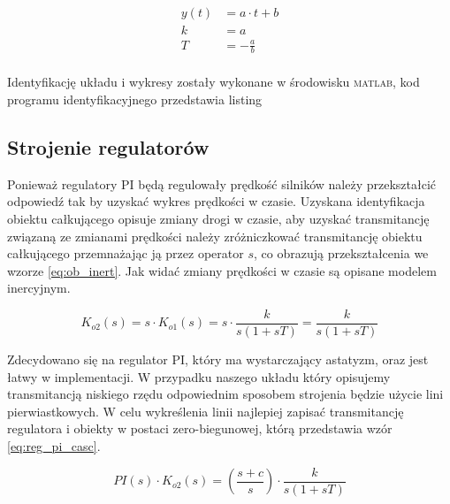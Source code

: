 \documentclass[11pt]{article}
\begin{document}
\begin{equation} \label{eq:line_param}
\begin{aligned}
	y(t) &= a \cdot t + b \\
	k &= a \\
	T &= - \frac{a}{b} \\
\end{aligned}
\end{equation}

Identyfikację układu i wykresy zostały wykonane w środowisku \textsc{matlab}, kod programu identyfikacyjnego przedstawia listing %

\subsection{Strojenie regulatorów}
Ponieważ regulatory \textsc{PI} będą regulowały prędkość silników należy przekształcić odpowiedź tak by uzyskać wykres prędkości w czasie.
Uzyskana identyfikacja obiektu całkującego opisuje zmiany drogi w czasie, aby uzyskać transmitancję związaną ze zmianami prędkości należy zróżniczkować transmitancję obiektu całkującego przemnażając ją przez operator $ s $, co obrazują przekształcenia we wzorze \ref{eq:ob_inert}. Jak widać zmiany prędkości w czasie są opisane modelem inercyjnym.

\begin{equation} \label{eq:ob_inert}
	K_{o2} \left( s \right) = s \cdot K_{o1} \left( s \right) = s \cdot \frac{k}{s \left( 1 + sT \right)} = \frac{k}{s \left( 1 + sT \right)}
\end{equation}

Zdecydowano się na regulator \textsc{PI}, który ma wystarczający astatyzm, oraz jest łatwy w implementacji.
W przypadku naszego układu który opisujemy transmitancją niskiego rzędu odpowiednim sposobem strojenia będzie użycie lini pierwiastkowych.
W celu wykreślenia linii najlepiej zapisać transmitancję regulatora i obiekty w postaci zero-biegunowej, którą przedstawia wzór \ref{eq:reg_pi_casc}.

\begin{equation} \label{eq:reg_pi_casc}
	PI \left( s \right) \cdot K_{o2} \left( s \right) = \left( \frac{s + c}{s} \right) \cdot \frac{k}{s \left( 1 + sT \right)}
\end{equation}
\end{document}
